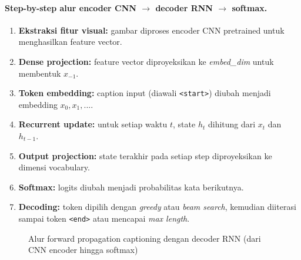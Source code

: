 \paragraph{Step-by-step alur encoder CNN $\rightarrow$ decoder RNN $\rightarrow$ softmax.}
\begin{enumerate}
    \item \textbf{Ekstraksi fitur visual:} gambar diproses encoder CNN pretrained untuk menghasilkan feature vector.
    \item \textbf{Dense projection:} feature vector diproyeksikan ke \textit{embed\_dim} untuk membentuk $x_{-1}$.
    \item \textbf{Token embedding:} caption input (diawali \texttt{<start>}) diubah menjadi embedding $x_0, x_1, ...$.
    \item \textbf{Recurrent update:} untuk setiap waktu $t$, state $h_t$ dihitung dari $x_t$ dan $h_{t-1}$.
    \item \textbf{Output projection:} state terakhir pada setiap step diproyeksikan ke dimensi vocabulary.
    \item \textbf{Softmax:} logits diubah menjadi probabilitas kata berikutnya.
    \item \textbf{Decoding:} token dipilih dengan \textit{greedy} atau \textit{beam search}, kemudian diiterasi sampai token \texttt{<end>} atau mencapai \textit{max length}.
\end{enumerate}

\begin{figure}[H]
    \centering
    \caption{Alur forward propagation captioning dengan decoder RNN (dari CNN encoder hingga softmax)}
    \label{fig:rnn-forward-flow}
\end{figure}

